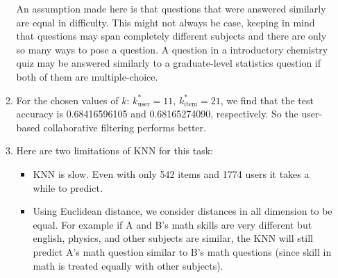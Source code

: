 \documentclass{article}
\begin{document}
\begin{enumerate}[label=\arabic*.]
\begin{enumerate}[label=(\alph*)]
                An assumption made here is that questions that were answered similarly are equal in difficulty. This might not always be case, keeping in mind that questions may span completely different subjects and there are only so many ways to pose a question. A question in a introductory chemistry quiz may be answered similarly to a graduate-level statistics question if both of them are multiple-choice.
            \item For the chosen values of $k$: $k^*_{\text{user}}=11$, $k^*_{\text{item}}=21$, we find that the test accuracy is 0.68416596105 and 0.68165274090, respectively. So the user-based collaborative filtering performs better.
            \item Here are two limitations of KNN for this task:
                \begin{itemize}
                    \item KNN is slow. Even with only 542 items and 1774 users it takes a while to predict.
                    \item Using Euclidean distance, we consider distances in all dimension to be equal. For example if A and B's math skills are very different but english, physics, and other subjects are similar, the KNN will still predict A's math question similar to B's math questions (since skill in math is treated equally with other subjects).
                \end{itemize}

        \end{enumerate}
        

\end{enumerate}
\end{document}

